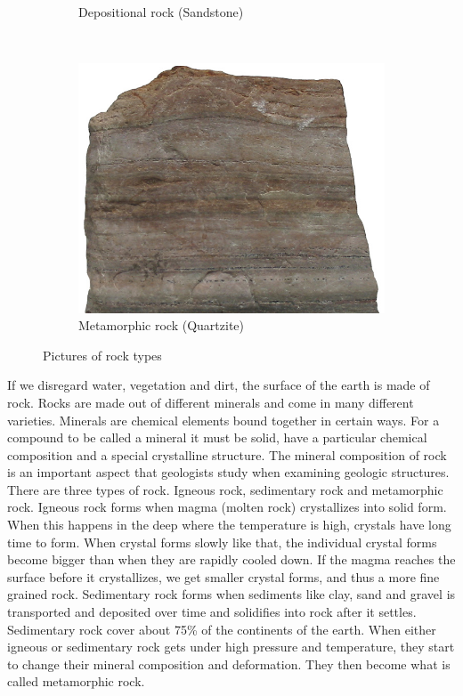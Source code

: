 \documentclass[a4paper,12pt]{report}
\begin{document}
\begin{figure}[]
\begin{subfigure}[b]{0.3\textwidth}
                \caption{Depositional rock (Sandstone)}
                \label{fig:tiger}
        \end{subfigure}
        ~ %
        \begin{subfigure}[b]{0.3\textwidth}
                \centering
                \includegraphics[width=\textwidth]{thesis/geo/quartzite.jpg}
                \caption{Metamorphic rock (Quartzite)}
                \label{fig:mouse}
        \end{subfigure}
        \caption{Pictures of rock types}\label{fig:rocks}
\end{figure}

If we disregard water, vegetation and dirt, the surface of the earth is made of rock. Rocks are made out of different minerals and come in many different varieties. Minerals are chemical elements bound together in certain ways. For a compound to be called a mineral it must be solid, have a particular chemical composition and a special crystalline structure. The mineral composition of rock is an important aspect that geologists study when examining geologic structures. There are three types of rock. Igneous rock, sedimentary rock and metamorphic rock. Igneous rock forms when magma (molten rock) crystallizes into solid form. When this happens in the deep where the temperature is high, crystals have long time to form. When crystal forms slowly like that, the individual crystal forms become bigger than when they are rapidly cooled down. If the magma reaches the surface before it crystallizes, we get smaller crystal forms, and thus a more fine grained rock. Sedimentary rock forms when sediments like clay, sand and gravel is transported and deposited over time and solidifies into rock after it settles. Sedimentary rock cover about 75\% of the continents of the earth. When either igneous or sedimentary rock gets under high pressure and temperature, they start to change their mineral composition and deformation. They then become what is called metamorphic rock.
\end{document}
